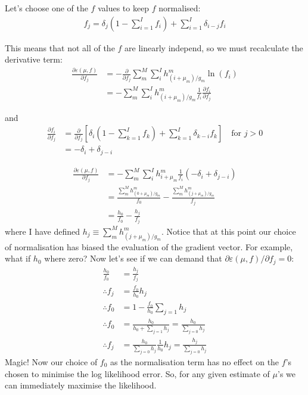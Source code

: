 \documentclass[11pt]{article}
\begin{document}
Let's choose one of the $f$ values to keep $f$ normalised:
\begin{align}
   f_j = \delta_{j} (1 - \sum_{i=1}^I f_i) + \sum_{i=1}^I \delta_{i-j} f_i
\end{align}

This means that not all of the $f$ are linearly independ, so we must recalculate the derivative term:
\begin{align}
   \frac{\partial \varepsilon(\mu, f)}{\partial f_j} &= -\frac{\partial}{\partial f_j} \sum_m^M \sum_i^I h^m_{(i+\mu_m)/g_m} \ln(f_i) \\
   &= - \sum_m^M \sum_i^I h^m_{(i+\mu_m)/g_m} \frac{1}{f_i} \frac{\partial f_i}{\partial f_j}
\end{align}

and
\begin{align}
   \frac{\partial f_i}{\partial f_j} &= \frac{\partial }{\partial f_j} \left[ \delta_{i} (1 - \sum_{k=1}^I f_k) + \sum_{k=1}^I \delta_{k-i} f_k \right] \quad \text{for } j > 0 \\
   &= -\delta_{i} + \delta_{j-i}
\end{align}

\begin{align}
   \frac{\partial \varepsilon(\mu, f)}{\partial f_j} &=- \sum_m^M \sum_i^I h^m_{i+\mu_m} \frac{1}{f_i} (-\delta_{i} + \delta_{j-i}) \\
   &= \frac{ \sum_m^M h^m_{(0+\mu_m)/g_m}}{f_0} - \frac{ \sum_m^M h^m_{(j+\mu_m)/g_m}}{f_j} \\
   &= \frac{ h_{0}}{f_0} - \frac{ h_{j}}{f_j}
\end{align}
where I have defined $h_j \equiv \sum_m^M h^m_{(j+\mu_m)/g_m}$. Notice that at this point our choice of normalisation has biased the evaluation of the gradient vector. For example, what if $h_0$ where zero? Now let's see if we can demand that $\partial \varepsilon(\mu, f) / \partial f_j = 0$:
\begin{align}
   \frac{ h_{0}}{f_0} &= \frac{ h_{j}}{f_j} \\
   \therefore f_j &= \frac{f_0}{h_0} h_j \\
   \therefore f_0 &= 1 -  \frac{f_0}{h_0} \sum_{j=1} h_j \\
   \therefore f_0 &= \frac{h_0}{h_0 + \sum_{j=1} h_j} = \frac{h_0}{\sum_{j=0} h_j} \\
   \therefore f_j &= \frac{h_0}{\sum_{j=0} h_j} \frac{1}{h_0} h_j = \frac{h_j}{\sum_{j=0} h_j}
\end{align}
Magic! Now our choice of $f_0$ as the normalisation term has no effect on the $f$'s chosen to minimise the log likelihood error. So, for any given estimate of $\mu$'s we can immediately maximise the likelihood. 
\end{document}
